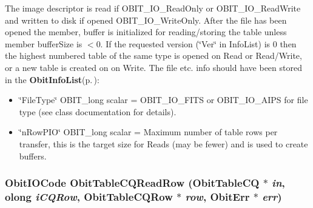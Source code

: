The image descriptor is read if OBIT\_\-IO\_\-Read\-Only or OBIT\_\-IO\_\-Read\-Write and written to disk if opened OBIT\_\-IO\_\-Write\-Only. After the file has been opened the member, buffer is initialized for reading/storing the table unless member buffer\-Size is $<$0. If the requested version (\char`\"{}Ver\char`\"{} in Info\-List) is 0 then the highest numbered table of the same type is opened on Read or Read/Write, or a new table is created on on Write. The file etc. info should have been stored in the {\bf Obit\-Info\-List}{\rm (p.\,\pageref{structObitInfoList})}: \begin{itemize}
\item \char`\"{}File\-Type\char`\"{} OBIT\_\-long scalar = OBIT\_\-IO\_\-FITS or OBIT\_\-IO\_\-AIPS for file type (see class documentation for details). \item \char`\"{}n\-Row\-PIO\char`\"{} OBIT\_\-long scalar = Maximum number of table rows per transfer, this is the target size for Reads (may be fewer) and is used to create buffers. 
\end{itemize}
\subsubsection{\setlength{\rightskip}{0pt plus 5cm}Obit\-IOCode Obit\-Table\-CQRead\-Row ({\bf Obit\-Table\-CQ} $\ast$ {\em in}, {\bf olong} {\em i\-CQRow}, {\bf Obit\-Table\-CQRow} $\ast$ {\em row}, {\bf Obit\-Err} $\ast$ {\em err})}\label{ObitTableCQ_8c_a22}


